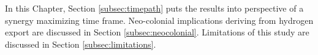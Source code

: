 
In this Chapter, Section \ref{subsec:timepath} puts the results into perspective of a synergy maximizing time frame. Neo-colonial implications deriving from hydrogen export are discussed in Section \ref{subsec:neocolonial}.
Limitations of this study are discussed in Section \ref{subsec:limitations}.









